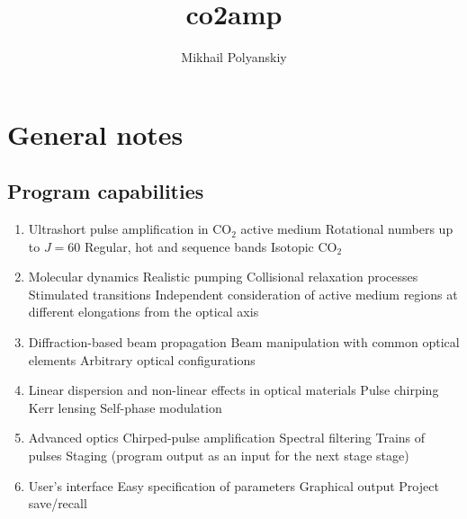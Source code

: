 \documentclass{report}
\begin{document}
\title{co2amp}
\author{Mikhail Polyanskiy}
\maketitle

\tableofcontents

\chapter{General notes}

\section{Program capabilities}
\begin{enumerate}
\item Ultrashort pulse amplification in {CO$_2$} active medium
\subitem Rotational numbers up to $J=60$
\subitem Regular, hot and sequence bands
\subitem Isotopic {CO$_2$}
\item Molecular dynamics
\subitem Realistic pumping
\subitem Collisional relaxation processes
\subitem Stimulated transitions
\subitem Independent consideration of active medium regions at different elongations from the optical axis
\item Diffraction-based beam propagation
\subitem Beam manipulation with common optical elements
\subitem Arbitrary optical configurations
\item Linear dispersion and non-linear effects in optical materials
\subitem Pulse chirping
\subitem Kerr lensing
\subitem Self-phase modulation
\item Advanced optics
\subitem Chirped-pulse amplification
\subitem Spectral filtering
\subitem Trains of pulses
\subitem Staging (program output as an input for the next stage stage)
\item User's interface
\subitem Easy specification of parameters
\subitem Graphical output
\subitem Project save/recall
\end{enumerate}
\end{document}
